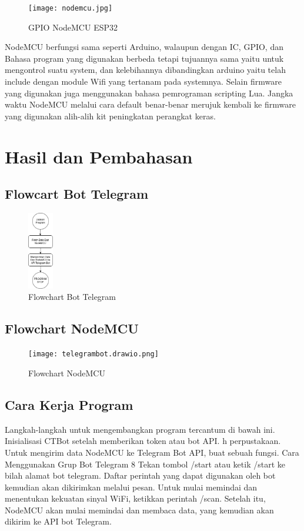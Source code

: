 \documentclass[conference]{IEEEtran}
\begin{document}
\begin{figure}[h]
        \centering
        \texttt{[image: nodemcu.jpg]}
        \caption{GPIO NodeMCU ESP32}
\end{figure}
    NodeMCU berfungsi sama seperti Arduino, walaupun dengan IC, GPIO, dan Bahasa program yang digunakan berbeda tetapi tujuannya sama yaitu untuk mengontrol suatu system, dan kelebihannya dibandingkan arduino yaitu telah include dengan module Wifi yang tertanam pada systemnya. Selain firmware yang digunakan juga menggunakan bahasa pemrograman scripting Lua. Jangka waktu NodeMCU melalui cara default benar-benar merujuk kembali ke firmware yang digunakan alih-alih kit peningkatan perangkat keras.
\vspace{0.5cm}
\section{Hasil dan Pembahasan}
    \subsection{Flowcart Bot Telegram}
          	\begin{figure}[h]
	        \centering
	        \includegraphics[width=0.1\textwidth]{telegrambot.png}
	        \caption{Flowchart Bot Telegram}
	 \end{figure}
    
    \subsection{Flowchart NodeMCU}
	    \begin{figure}[h]
	        \centering
	        \texttt{[image: telegrambot.drawio.png]}
	        \caption{Flowchart NodeMCU}
	    \end{figure}
	    \vspace{1cm}
    \subsection{Cara Kerja Program}
	Langkah-langkah untuk mengembangkan program tercantum di bawah ini. Inisialisasi CTBot setelah memberikan token atau bot API. h perpustakaan. Untuk mengirim data NodeMCU ke Telegram Bot API, buat sebuah fungsi.
	Cara Menggunakan Grup Bot Telegram 8 Tekan tombol /start atau ketik /start ke bilah alamat bot telegram. Daftar perintah yang 	dapat digunakan oleh bot kemudian akan dikirimkan melalui pesan.
	Untuk mulai memindai dan menentukan kekuatan sinyal WiFi, ketikkan perintah /scan.
Setelah itu, NodeMCU akan mulai memindai dan membaca data, yang kemudian akan dikirim ke API bot Telegram.
\end{document}
